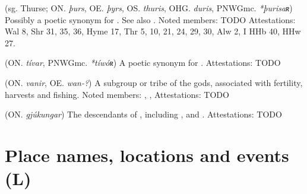 \begin{itemize}
 (sg. Thurse; ON. \emph{þurs}, OE. \emph{þyrs}, OS. \emph{thuris}, OHG. \emph{duris}, PNWGmc. \emph{*þurisaʀ})
  Possibly a poetic synonym for . See also .
  Noted members: TODO
  Attestations: Wal 8, Shr 31, 35, 36, Hyme 17, Thr 5, 10, 21, 24, 29, 30, Alw 2, I HHb 40, HHw 27.

 (ON. \emph{tívar}, PNWGmc. \emph{*tíwóʀ})
  A poetic synonym for .
  Attestations: TODO

 (ON. \emph{vanir}, OE. \emph{wan-?})
  A subgroup or tribe of the gods, associated with fertility, harvests and fishing.
  Noted members: , , 
  Attestations: TODO

 (ON. \emph{gjúkungar})
  The descendants of , including ,  and .
  Attestations: TODO

\end{itemize}


\section{Place names, locations and events (L)}

